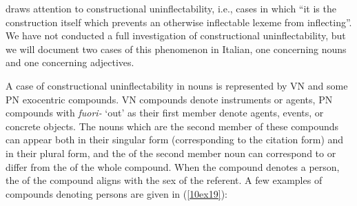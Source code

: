 \documentclass[output=paper,colorlinks,citecolor=brown]{langscibook}
\begin{document}
\citet[148]{spencer2020} draws attention to constructional uninflectability, i.e., cases in which ``it is the construction itself which prevents an otherwise inflectable lexeme from inflecting''. We have not conducted a full investigation of constructional uninflectability, but we will document two cases of this phenomenon in Italian, one concerning nouns and one concerning adjectives.

A case of constructional uninflectability in nouns is represented by VN and some PN exocentric compounds. VN compounds denote instruments or agents, PN compounds with \emph{fuori-} `out' as their first member denote agents, events, or concrete objects. The nouns which are the second member of these compounds can appear both in their singular form (corresponding to the citation form) and in their plural form, and the  of the second member noun can correspond to or differ from the
 of the whole compound. When the compound denotes a person, the  of the compound aligns with the sex of the referent. A few examples of compounds denoting persons are given in (\ref{10ex19}):
\end{document}
